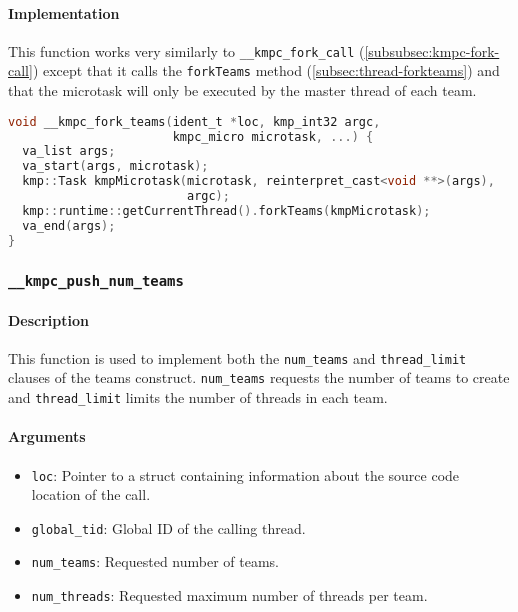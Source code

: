 \paragraph{Implementation} This function works very similarly to \texttt{__kmpc_fork_call}
(\cref{subsubsec:kmpc-fork-call}) except that it calls the \texttt{forkTeams} method
(\cref{subsec:thread-forkteams})
and that the microtask will only be executed by the master thread of each team.

\begin{lstlisting}[language=C, caption={__kmpc_fork_teams}, label={lst:kmpc-fork-teams}, escapechar=@]
void __kmpc_fork_teams(ident_t *loc, kmp_int32 argc,
                       kmpc_micro microtask, ...) {
  va_list args;
  va_start(args, microtask);
  kmp::Task kmpMicrotask(microtask, reinterpret_cast<void **>(args),
                         argc);
  kmp::runtime::getCurrentThread().forkTeams(kmpMicrotask);
  va_end(args);
}
\end{lstlisting}

\subsubsection{\texttt{__kmpc_push_num_teams}}
\label{subsubsec:kmpc-push-num-teams}

\paragraph{Description} This function is used to implement both the \texttt{num_teams} and
\texttt{thread_limit} clauses of the teams construct. \texttt{num\_teams} requests the number of
teams to create and \texttt{thread\_limit} limits the number of threads in each team.

\paragraph{Arguments}
\begin{itemize}
	\item \texttt{loc}: Pointer to a struct containing information about the source code location
	      of the call.
	\item \texttt{global\_tid}: Global ID of the calling thread.
	\item \texttt{num\_teams}: Requested number of teams.
	\item \texttt{num\_threads}: Requested maximum number of threads per team.
\end{itemize}


